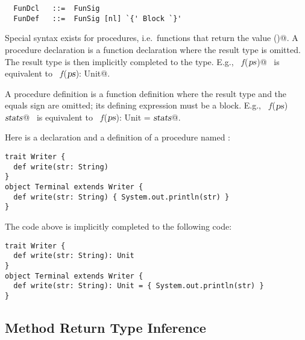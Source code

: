 \syntax\begin{lstlisting} 
  FunDcl   ::=  FunSig
  FunDef   ::=  FunSig [nl] `{' Block `}'
\end{lstlisting}

Special syntax exists for procedures, i.e.\ functions that return the
\verb@Unit@ value \verb@()@. 
A procedure declaration is a function declaration where the result type
is omitted. The result type is then implicitly completed to the
\verb@Unit@ type. E.g., ~\lstinline@def $f$($\mbox{\sl ps}$)@~ is equivalent to
~\lstinline@def $f$($\mbox{\sl ps}$): Unit@.

A procedure definition is a function definition where the result type
and the equals sign are omitted; its defining expression must be a block.
E.g., ~\lstinline@def $f$($\mbox{\sl ps}$) {$\mbox{\sl stats}$}@~ is equivalent to
~\lstinline@def $f$($\mbox{\sl ps}$): Unit = {$\mbox{\sl stats}$}@.

\example Here is a declaration and a definition of a procedure named \lstinline@write@: 
\begin{lstlisting}
trait Writer { 
  def write(str: String)
}
object Terminal extends Writer {
  def write(str: String) { System.out.println(str) }
}
\end{lstlisting}
The code above is implicitly completed to the following code:
\begin{lstlisting}
trait Writer { 
  def write(str: String): Unit
}
object Terminal extends Writer {
  def write(str: String): Unit = { System.out.println(str) }
}
\end{lstlisting}

\subsection{Method Return Type Inference}\label{sec:meth-type-inf}


